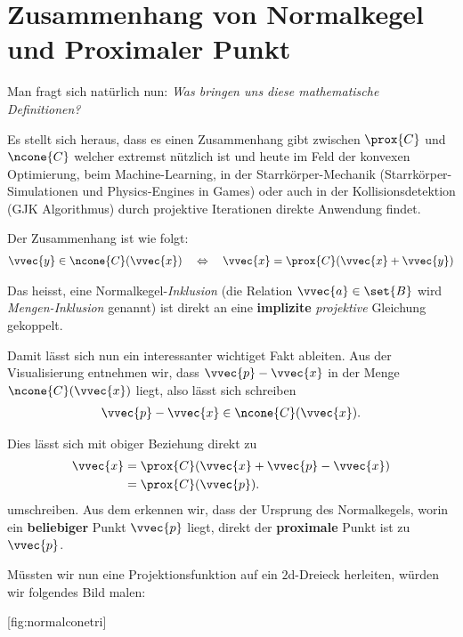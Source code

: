 \documentclass[
  12pt,
  british,
  a4paper,
  twoside,
  titlepage,
  openright,
  numbers=noenddot,
  chapterprefix=true,
  headings=optiontohead,
  svgnames,
  dvipsnames]{scrreprt}
\begin{document}
\hypertarget{zusammenhang-von-normalkegel-und-proximaler-punkt}{%
\section{Zusammenhang von Normalkegel und Proximaler
Punkt}\label{zusammenhang-von-normalkegel-und-proximaler-punkt}}

Man fragt sich natürlich nun: \emph{Was bringen uns diese mathematische
Definitionen?}

Es stellt sich heraus, dass es einen Zusammenhang gibt zwischen
\(\prox{C}\) und \(\ncone{C}\) welcher extremst nützlich ist und heute
im Feld der konvexen Optimierung, beim Machine-Learning, in der
Starrkörper-Mechanik (Starrkörper-Simulationen und Physics-Engines in
Games) oder auch in der Kollisionsdetektion (GJK Algorithmus) durch
projektive Iterationen direkte Anwendung findet.

Der Zusammenhang ist wie folgt: \begin{align}
\vvec{y} \in \ncone{C}(\vvec{x}) \quad \Leftrightarrow \quad \vvec{x} = \prox{C}(\vvec{x} + \vvec{y})
\label{eq:prox-to-ncone}
\end{align}

Das heisst, eine Normalkegel-\emph{Inklusion} (die Relation
\(\vvec{a} \in \set{B}\) wird \emph{Mengen-Inklusion} genannt) ist
direkt an eine \textbf{implizite} \emph{projektive} Gleichung gekoppelt.

Damit lässt sich nun ein interessanter wichtiget Fakt ableiten. Aus der
Visualisierung  entnehmen wir, dass
\(\vvec{p}-\vvec{x}\) in der Menge \(\ncone{C}(\vvec{x})\) liegt, also
lässt sich schreiben \begin{align}
\vvec{p}-\vvec{x} \in \ncone{C}(\vvec{x}).
\end{align}

Dies lässt sich mit obiger Beziehung direkt zu \begin{align}
\vvec{x} &= \prox{C}(\vvec{x} + \vvec{p} - \vvec{x}) \\
&= \prox{C}(\vvec{p}).
\end{align} umschreiben. Aus dem erkennen wir, dass der Ursprung des
Normalkegels, worin ein \textbf{beliebiger} Punkt \(\vvec{p}\) liegt,
direkt der \textbf{proximale} Punkt ist zu \(\vvec{p}\).

Müssten wir nun eine Projektionsfunktion auf ein \(2\)d-Dreieck
herleiten, würden wir folgendes Bild malen:

[fig:normalconetri]
\end{document}
